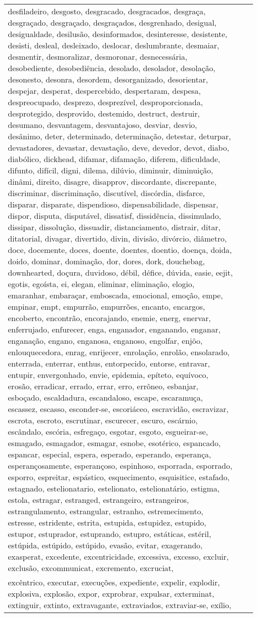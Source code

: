\begin{longtable}{|*3{p{15cm}|}}
desfiladeiro, desgosto, desgracado, desgracados, desgraça, desgraçado, desgraçado, desgraçados, desgrenhado, desigual, desigualdade, desilusão, desinformados, desinteresse, desistente, desisti, desleal, desleixado, deslocar, deslumbrante, desmaiar, desmentir, desmoralizar, desmoronar, desnecessária, desobediente, desobediência, desolado, desolador, desolação, desonesto, desonra, desordem, desorganizado, desorientar, despejar, desperat, despercebido, despertaram, despesa, despreocupado, desprezo, desprezível, desproporcionada, desprotegido, desprovido, destemido, destruct, destruir, desumano, desvantagem, desvantajoso, desviar, desvio, desânimo, deter, determinado, determinação, detestar, deturpar, devastadores, devastar, devastação, deve, devedor, devot, diabo, diabólico, dickhead, difamar, difamação, diferem, dificuldade, difunto, difícil, digni, dilema, dilúvio, diminuir, diminuição, dinâmi, direito, disagre, disapprov, discordante, discrepante, discriminar, discriminação, discutível, discórdia, disfarce, disparar, disparate, dispendioso, dispensabilidade, dispensar, dispor, disputa, disputável, dissatisf, dissidência, dissimulado, dissipar, dissolução, dissuadir, distanciamento, distrair, ditar, ditatorial, divagar, divertido, divin, divisão, divórcio, diâmetro, doce, docemente, doces, doente, doentes, doentio, doença, doida, doido, dominar, dominação, dor, dores, dork, douchebag, downhearted, doçura, duvidoso, débil, défice, dúvida, easie, eejit, egotis, egoísta, ei, elegan, eliminar, eliminação, elogio, emaranhar, embaraçar, emboscada, emocional, emoção, empe, empinar, empt, empurrão, empurrões, encanto, encargos, encoberto, encontrão, encorajando, enemie, energ, enervar, enferrujado, enfurecer, enga, enganador, enganando, enganar, enganação, engano, enganosa, enganoso, engolfar, enjôo, enlouquecedora, enrag, enrijecer, enrolação, enrolão, ensolarado, enterrada, enterrar, enthus, entorpecido, entorse, entravar, entupir, envergonhado, envie, epidemia, epíteto, equívoco, erosão, erradicar, errado, errar, erro, errôneo, esbanjar, esboçado, escaldadura, escandaloso, escape, escaramuça, escassez, escasso, esconder-se, escoriáceo, escravidão, escravizar, escrota, escroto, escrutinar, escurecer, escuro, escárnio, escândalo, escória, esfregaço, esgotar, esgoto, esgueirar-se, esmagado, esmagador, esmagar, esnobe, esotérico, espancado, espancar, especial, espera, esperado, esperando, esperança, esperançosamente, esperançoso, espinhoso, esporrada, esporrado, esporro, espreitar, espástico, esquecimento, esquisitice, estafado, estagnado, estelionatario, estelionato, estelionatário, estigma, estola, estragar, estranged, estrangeiro, estrangeiros, estrangulamento, estrangular, estranho, estremecimento, estresse, estridente, estrita, estupida, estupidez, estupido, estupor, estuprador, estuprando, estupro, estáticas, estéril, estúpida, estúpido, estúpido, evasão, evitar, exagerando, exasperat, excedente, excentricidade, excessiva, excesso, excluir, exclusão, excommunicat, excremento, excruciat, \\ excêntrico, executar, execuções, expediente, expelir, explodir, explosiva, explosão, expor, exprobrar, expulsar, exterminat, extinguir, extinto, extravagante, extraviados, extraviar-se, exílio, 
\end{longtable}
